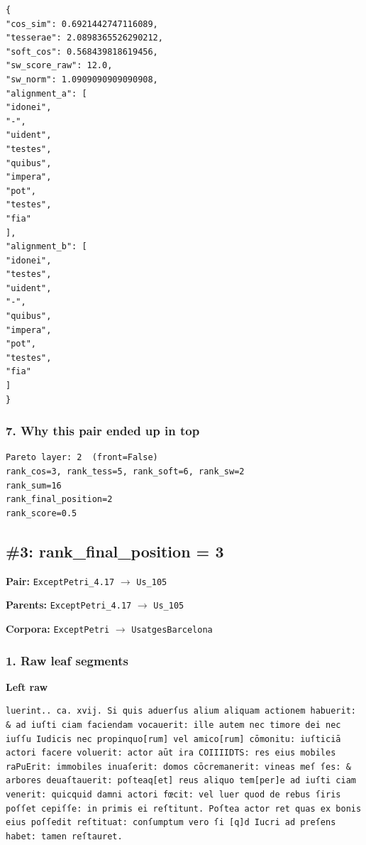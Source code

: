 \begin{lstlisting}[breaklines=true,basicstyle=\ttfamily\small,language={}]
{
"cos_sim": 0.6921442747116089,
"tesserae": 2.0898365526290212,
"soft_cos": 0.568439818619456,
"sw_score_raw": 12.0,
"sw_norm": 1.0909090909090908,
"alignment_a": [
"idonei",
"-",
"uident",
"testes",
"quibus",
"impera",
"pot",
"testes",
"fia"
],
"alignment_b": [
"idonei",
"testes",
"uident",
"-",
"quibus",
"impera",
"pot",
"testes",
"fia"
]
}
\end{lstlisting}

\subsubsection{7. Why this pair ended up in top}

\begin{lstlisting}[breaklines=true,basicstyle=\ttfamily\small]
Pareto layer: 2  (front=False)
rank_cos=3, rank_tess=5, rank_soft=6, rank_sw=2
rank_sum=16
rank_final_position=2
rank_score=0.5
\end{lstlisting}

\subsection{\#3: rank\_final\_position = 3}

\textbf{Pair:} \texttt{ExceptPetri\_4.17} $\rightarrow$ \texttt{Us\_105}

\textbf{Parents:} \texttt{ExceptPetri\_4.17} $\rightarrow$ \texttt{Us\_105}

\textbf{Corpora:} \texttt{ExceptPetri} $\rightarrow$ \texttt{UsatgesBarcelona}

\subsubsection{1. Raw leaf segments}

\textbf{Left raw} 

\begin{lstlisting}[breaklines=true,basicstyle=\ttfamily\small]
luerint.. ca. xvij. Si quis aduerſus alium aliquam actionem habuerit: & ad iuſti ciam faciendam vocauerit: ille autem nec timore dei nec iuſſu Iudicis nec propinquo[rum] vel amico[rum] cōmonitu: iuſticiā actori facere voluerit: actor aūt ira COIIIIDTS: res eius mobiles raPuErit: immobiles inuaſerit: domos cōcremanerit: vineas meſ ſes: & arbores deuaſtauerit: poſteaq[et] reus aliquo tem[per]e ad iuſti ciam venerit: quicquid damni actori fœcit: vel luer quod de rebus ſiris poſſet cepiſſe: in primis ei reſtitunt. Poſtea actor ret quas ex bonis eius poſſedit reſtituat: conſumptum vero ſi [q]d Iucri ad preſens habet: tamen reſtauret.
\end{lstlisting}

